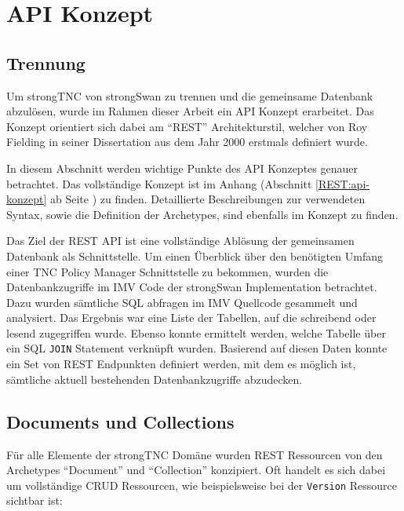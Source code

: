 \chapter{API Konzept}
\label{apikonzept}

\section{Trennung}

Um strongTNC von strongSwan zu trennen und die gemeinsame Datenbank abzulösen,
wurde im Rahmen dieser Arbeit ein API Konzept erarbeitet. Das Konzept orientiert
sich dabei am \enquote{REST} Architekturstil, welcher von Roy Fielding in seiner
Dissertation aus dem Jahr 2000 erstmals definiert
wurde\cite{fielding2000architectural}.

In diesem Abschnitt werden wichtige Punkte des API Konzeptes genauer betrachtet.
Das vollständige Konzept ist im Anhang (Abschnitt \ref{REST:api-konzept} ab
Seite \pageref{REST:api-konzept}) zu finden. Detaillierte Beschreibungen zur
verwendeten Syntax, sowie die Definition der Archetypes, sind ebenfalls im
Konzept zu finden.


Das Ziel der REST API ist eine vollständige Ablösung der gemeinsamen Datenbank
als Schnittstelle. Um einen Überblick über den benötigten Umfang einer TNC
Policy Manager Schnittstelle zu bekommen, wurden die Datenbankzugriffe im IMV
Code der strongSwan Implementation betrachtet. Dazu wurden sämtliche SQL
abfragen im IMV Quellcode gesammelt und analysiert. Das Ergebnis war eine Liste
der Tabellen, auf die schreibend oder lesend zugegriffen wurde. Ebenso konnte
ermittelt werden, welche Tabelle über ein SQL \texttt{JOIN} Statement verknüpft
wurden. Basierend auf diesen Daten konnte ein Set von REST Endpunkten definiert
werden, mit dem es möglich ist, sämtliche aktuell bestehenden Datenbankzugriffe
abzudecken.

\section{Documents und Collections}

Für alle Elemente der strongTNC Domäne wurden REST Ressourcen von den Archetypes
\enquote{Document} und \enquote{Collection} konzipiert. Oft handelt es sich
dabei um vollständige CRUD Ressourcen, wie beispielsweise bei der
\texttt{Version} Ressource sichtbar ist:

